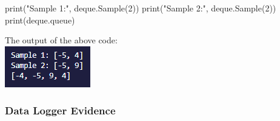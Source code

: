 \begin{center}
\begin{pythoncode}
print("Sample 1:", deque.Sample(2))
print("Sample 2:", deque.Sample(2))
print(deque.queue)
    \end{pythoncode}

    The output of the above code: \\
    \includegraphics{Images/Testing/T3.10.1.PNG}
    \vspace{1cm}
\end{center}

\subsubsection{Data Logger Evidence}

